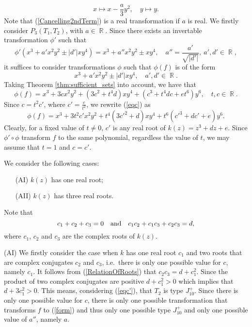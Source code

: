 \documentclass[noend]{amsproc}
\theoremstyle{definition}
\DeclareMathOperator{\R}{\mathbb{R}}
\begin{document}
\begin{equation}\label{Cancelling2ndTerm}
x\mapsto x-\frac{a}{3}y^2,\quad y\mapsto y.
\end{equation}
Note that (\ref{Cancelling2ndTerm}) is a real transformation if $a$ is real.
We firstly consider $P_3(T_1,T_2)$, with $a\in\R$. Since there exists an
invertable transformation $\phi'$ such that
\begin{equation}\label{phi'}
\phi'(x^3+a'x^2y^2\pm |d'|xy^4)=x^3+a''x^2y^2\pm xy^4,\quad
a''=\frac{a'}{\sqrt{|d'|}},\ a',d'\in \R,
\end{equation}
it suffices to consider transformations $\phi$ such that $\phi(f)$ is of the
form
\begin{equation}\label{form}
x^3+a'x^2y^2\pm |d'|xy^4,\quad a',d'\in \R.
\end{equation}
Taking Theorem \ref{thm:sufficient_sets} into account, we have that
\begin{equation}\label{eqc}
\phi(f)=x^3+3cx^2y^2+(3c^2+t^4d)xy^4+(c^3+t^4dc+et^6)y^6,\quad t,c\in\R.
\end{equation}
Since $c=t^2c'$, where $c'=\frac{c}{t^2}$, we rewrite (\ref{eqc}) as
\begin{equation}\label{eqc'}
\phi(f)=x^3+3t^2c'x^2y^2+t^4(3c'^2+d)xy^4+t^6(c'^3+dc'+e)y^6.
\end{equation}
Clearly, for a fixed value of $t\neq 0$, $c'$ is any real root of
$k(z)=z^3+dz+e$. Since $\phi'\circ\phi$ transform $f$ to the same polynomial,
regardless the value of $t$, we may assume that $t=1$ and $c=c'$.

We consider the following cases:
\begin{itemize}
\item[(AI)]$k(z)$ has one real root;
\item[(AII)]$k(z)$ has three real roots.
\end{itemize}

Note that
\begin{equation}\label{RelationOfRoots}
c_1+c_2+c_3=0\quad\textnormal{and}\quad c_1c_2+c_1c_3+c_2c_3=d,
\end{equation}
where $c_1$, $c_2$ and $c_3$ are the complex roots of $k(z)$.

(AI) We firstly consider the case when $k$ has one real root $c_1$ and two
roots that are complex conjugates $c_2$ and $c_3$, i.e.~there is only one
possible value for $c$, namely $c_1$. It follows from (\ref{RelationOfRoots})
that $c_2c_3=d+c_1^2$. Since the product of two complex conjugates are positive
$d+c_1^2>0$ which implies that $d+3c_1^2>0$. This means, considering
(\ref{eqc'}), that $T_2$ is type $J_{10}^+$. Since there is only one possible
value for $c$, there is only one possible transformation that transforms $f$ to
(\ref{form}) and thus only one possible type $J_{10}^+$ and only one possible
value of $a''$, namely $a$.
\end{document}
